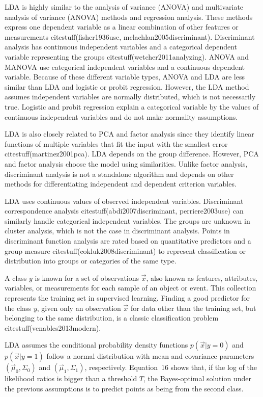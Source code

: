 \documentclass[preprint,12pt]{elsarticle}
\begin{document}
LDA is highly similar to the analysis of variance (ANOVA) and multivariate analysis of variance (ANOVA) methods and regression analysis. These methods express one dependent variable as a linear combination of other features or measurements citestuff(fisher1936use, mclachlan2005discriminant). Discriminant analysis has continuous independent variables and a categorical dependent variable representing the groups citestuff(wetcher2011analyzing). ANOVA and MANOVA use categorical independent variables and a continuous dependent variable. Because of these different variable types, ANOVA and LDA are less similar than LDA and logistic or probit regression. However, the LDA method assumes independent variables are normally distributed, which is not necessarily true. Logistic and probit regression explain a categorical variable by the values of continuous independent variables and do not make normality assumptions.

LDA is also closely related to PCA and factor analysis since they identify linear functions of multiple variables that fit the input with the smallest error citestuff(martinez2001pca). LDA depends on the group difference. However, PCA and factor analysis choose the model using similarities. Unlike factor analysis, discriminant analysis is not a standalone algorithm and depends on other methods for differentiating independent and dependent criterion variables.

LDA uses continuous values of observed independent variables. Discriminant correspondence analysis citestuff(abdi2007discriminant, perriere2003use) can similarly handle categorical independent variables. The groups are unknown in cluster analysis, which is not the case in discriminant analysis. Points in discriminant function analysis are rated based on quantitative predictors and a group measure citestuff(cokluk2008discriminant) to represent classification or distribution into groups or categories of the same type.

A class $y$ is known for a set of observations $\vec{x}$, also known as features, attributes, variables, or measurements for each sample of an object or event. This collection represents the training set in supervised learning. Finding a good predictor for the class $y$, given only an observation $\vec{x}$ for data other than the training set, but belonging to the same distribution, is a classic classification problem citestuff(venables2013modern).

LDA assumes the conditional probability density functions $p({\vec{x}}|y=0)$ and $p({\vec{x}}|y=1)$ follow a normal distribution with mean and covariance parameters $\left({\vec{\mu}}_{0},\Sigma_{0}\right)$ and $\left({\vec{\mu}}_{1},\Sigma_{1}\right)$, respectively. Equation~16 shows that, if the log of the likelihood ratios is bigger than a threshold $T$, the Bayes-optimal solution under the previous assumptions is to predict points as being from the second class.
\end{document}
